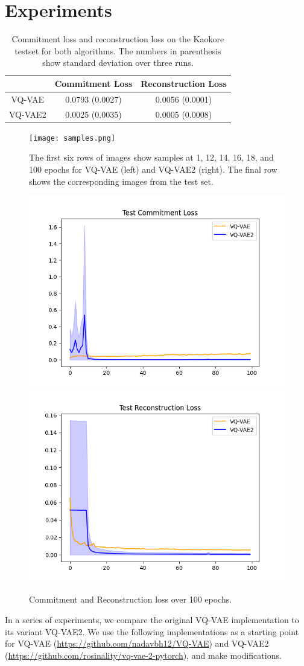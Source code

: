 \documentclass{article}
\begin{document}
\section{Experiments}

\begin{table}
    \centering
    \begin{tabular}{c c c}
        & Commitment Loss & Reconstruction Loss \\
        \hline
        VQ-VAE & 0.0793 (0.0027) & 0.0056 (0.0001) \\
        VQ-VAE2 & 0.0025 (0.0035) & 0.0005 (0.0008)
    \end{tabular}
    \label{table:loss}
    \caption{Commitment loss and reconstruction loss on the Kaokore testset for both algorithms. The numbers in parenthesis show standard deviation over three runs.}
\end{table}

\begin{figure}
    \centering
    \texttt{[image: samples.png]}
    \label{fig:samples}
    \caption{The first six rows of images show samples at 1, 12, 14, 16, 18, and 100 epochs for VQ-VAE (left) and VQ-VAE2 (right). The final row shows the corresponding images from the test set.}
\end{figure} 

\begin{figure}
    \centering
    \includegraphics[width=.4\linewidth]{commit.png}
    \includegraphics[width=.4\linewidth]{recon.png}
    \caption{Commitment and Reconstruction loss over 100 epochs.}
    \label{fig:loss}
\end{figure}

In a series of experiments, we compare the original VQ-VAE implementation to its variant VQ-VAE2. We use the following implementations as a starting point for VQ-VAE (\url{https://github.com/nadavbh12/VQ-VAE}) and VQ-VAE2 (\url{https://github.com/rosinality/vq-vae-2-pytorch}), and make modifications.
\end{document}
